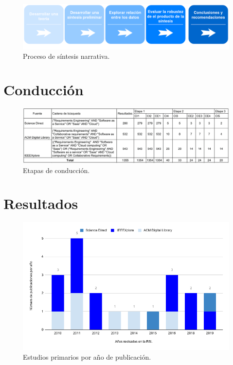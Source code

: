 \documentclass[conference,onecolumn,10pt]{IEEEtran}
\begin{document}
\begin{figure}[!htb]
   \includegraphics[width=\linewidth]{narrativa.png}
   \caption{Proceso de síntesis narrativa.}
   \label{fig:sistesisnarrativa}
\end{figure}
\newpage

\section{Conducción}
\begin{figure}[!htb]
   \includegraphics[width=\linewidth]{etapas.png}
   \caption{Etapas de conducción.}
   \label{fig:etapasconducción}
\end{figure}
\newpage

\section{Resultados}

\begin{figure}[!htb]
   \includegraphics[width=\linewidth]{chart.png}
   \caption{Estudios primarios por año de publicación.}
   \label{fig:estudiostotales}
\end{figure}
\end{document}
